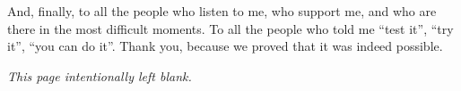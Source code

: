 And, finally, to all the people who listen to me, who support me, and who are
there in the most difficult moments. To all the people who told me
``test it'', ``try it'', ``you can do it''. Thank you, because we proved
that it was indeed possible.

\par
\endgroup

\clearpage
\thispagestyle{empty}
\null\vfill
\begin{center}
  \textit{This page intentionally left blank.}
\end{center}
\vfill\null
